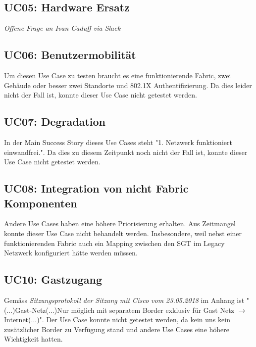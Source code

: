 \begin{landscape}
\subsection{UC05: Hardware Ersatz}
\textit{Offene Frage an Ivan Caduff via Slack}



\subsection{UC06: Benutzermobilität}
Um diesen Use Case zu testen braucht es eine funktionierende Fabric, zwei Gebäude oder besser zwei Standorte und 802.1X Authentifizierung. Da dies leider nicht der Fall ist, konnte dieser Use Case nicht getestet werden. 



\subsection{UC07: Degradation}
In der Main Success Story dieses Use Cases steht "1. Netzwerk funktioniert einwandfrei.". Da dies zu diesem Zeitpunkt noch nicht der Fall ist, konnte dieser Use Case nicht getestet werden. 



\subsection{UC08: Integration von nicht Fabric Komponenten}
Andere Use Cases haben eine höhere Priorisierung erhalten. Aus Zeitmangel konnte dieser Use Case nicht behandelt werden. Insbesondere, weil nebst einer funktionierenden Fabric auch ein Mapping zwischen den SGT im Legacy Netzwerk konfiguriert hätte werden müssen. 


\subsection{UC10: Gastzugang}
Gemäss \textit{Sitzungsprotokoll der Sitzung mit Cisco vom 23.05.2018} im Anhang ist "(...)Gast-Netz(...)Nur möglich mit separatem Border exklusiv für Gast Netz $\rightarrow$ Internet(...)". Der Use Case konnte nicht getestet werden, da kein uns kein zusätzlicher Border zu Verfügung stand und andere Use Cases eine höhere Wichtigkeit hatten. 


\pagebreak


\end{landscape}

